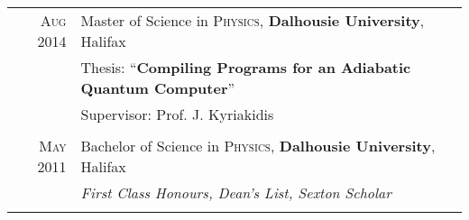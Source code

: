 \documentclass[a4paper,11pt]{article} %
\begin{document}
\begin{tabular}{rl}	

\textsc{Aug} 2014 & Master of Science in \textsc{Physics}, \textbf{Dalhousie University}, Halifax \\
& Thesis: ``\textbf{Compiling Programs for an Adiabatic Quantum Computer}'' \\
& \small Supervisor: Prof. J. Kyriakidis \\
& \\

\textsc{May} 2011 & Bachelor of Science in \textsc{Physics}, \textbf{Dalhousie University}, Halifax \\
& \emph{First Class Honours, Dean's List, Sexton Scholar}  \\
& \\







\end{tabular}
\end{document}
